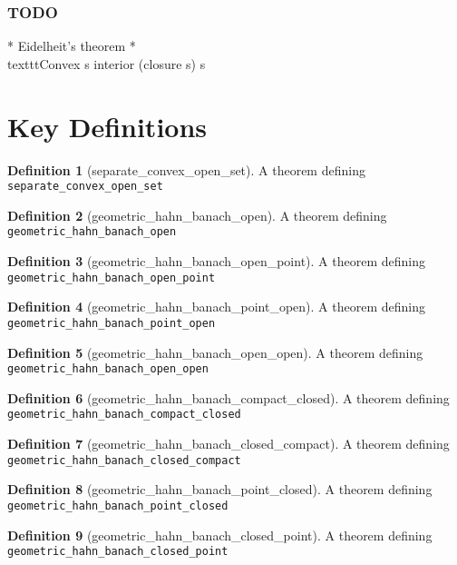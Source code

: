 \documentclass{article}
\theoremstyle{definition}
\newtheorem{definition}{Definition}
\begin{document}
\subsubsection{TODO}

* Eidelheit's theorem
* \\texttt{Convex  s \to interior (closure s) \subseteq s}

\section{Key Definitions}
\begin{definition}[separate_convex_open_set]
A theorem defining \texttt{separate_convex_open_set}
\end{definition}

\begin{definition}[geometric_hahn_banach_open]
A theorem defining \texttt{geometric_hahn_banach_open}
\end{definition}

\begin{definition}[geometric_hahn_banach_open_point]
A theorem defining \texttt{geometric_hahn_banach_open_point}
\end{definition}

\begin{definition}[geometric_hahn_banach_point_open]
A theorem defining \texttt{geometric_hahn_banach_point_open}
\end{definition}

\begin{definition}[geometric_hahn_banach_open_open]
A theorem defining \texttt{geometric_hahn_banach_open_open}
\end{definition}

\begin{definition}[geometric_hahn_banach_compact_closed]
A theorem defining \texttt{geometric_hahn_banach_compact_closed}
\end{definition}

\begin{definition}[geometric_hahn_banach_closed_compact]
A theorem defining \texttt{geometric_hahn_banach_closed_compact}
\end{definition}

\begin{definition}[geometric_hahn_banach_point_closed]
A theorem defining \texttt{geometric_hahn_banach_point_closed}
\end{definition}

\begin{definition}[geometric_hahn_banach_closed_point]
A theorem defining \texttt{geometric_hahn_banach_closed_point}
\end{definition}
\end{document}
